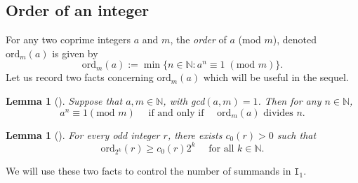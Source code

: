 \documentclass[12pt, twoside]{article}
\newtheorem{lemma}[theorem]{Lemma}
\theoremstyle{definition}
\numberwithin{equation}{section}
\begin{document}
\subsection{Order of an integer} \label{integer-order-section} 
For any two coprime integers $a$ and $m$, the {\em{order}} of $a$ (mod $m$), denoted $\text{ord}_m(a)$ is given by
\begin{equation} 
\text{ord}_m(a) := \min\bigl\{n \in \mathbb N: a^n \equiv 1 \; (\text{mod } m) \bigr\}. 
\end{equation}  
Let us record two facts concerning $\text{ord}_m(a)$ which will be useful in the sequel. 
\begin{lemma}[{\cite[Theorem 88]{hw08}}] \label{hw-lemma} 
Suppose that $a, m \in \mathbb N$, with gcd$(a, m) = 1$. Then for any $n \in \mathbb N$, 
\begin{equation*} 
a^n \equiv 1 (\text{mod } m) \quad \text{ if and only if } \quad \text{ord}_m(a) \text{ divides } n.  
\end{equation*} 
\end{lemma} 
\begin{lemma}[{\cite[Lemma 4]{s60}}] \label{Schmidt-lemma}
For every odd integer $r$, there exists $c_0(r) > 0$ such that 
\begin{equation} 
\text{ord}_{2^k}(r) \geq c_0(r) 2^k \quad \text{ for all } k \in \mathbb N. 
\end{equation} 
\end{lemma} 
\noindent We will use these two facts to control the number of summands in $\mathtt I_1$. 
\end{document}
